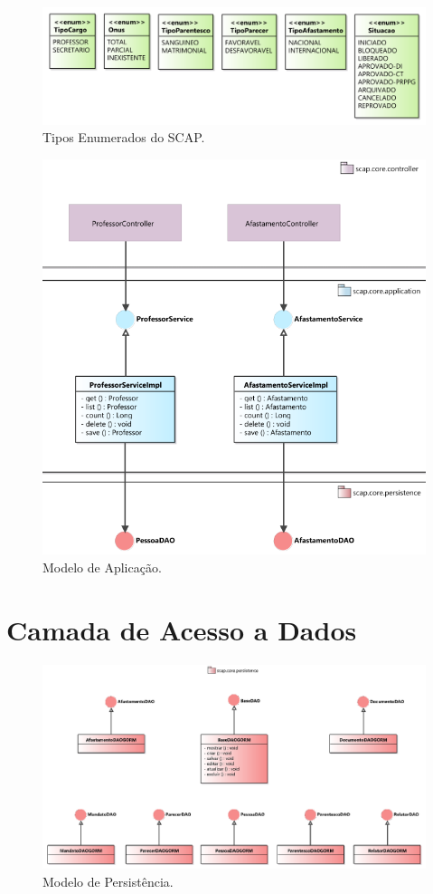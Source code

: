 \begin{figure}[h]
	\centering
	\includegraphics[width=1\textwidth]{figuras/figura-arquitetura-enum.png}
	\caption{Tipos Enumerados do SCAP.}
	\label{figura-arquitetura-enum}
\end{figure}

\begin{figure}[h]
	\centering
	\includegraphics[width=1\textwidth]{figuras/figura-arquitetura-aplicacao.png}
	\caption{Modelo de Aplicação.}
	\label{figura-arquitetura-aplicacao}
\end{figure}

\section{Camada de Acesso a Dados}
\label{sec-arquitetura-dados}


\begin{figure}[h]
	\centering
	\includegraphics[width=1\textwidth]{figuras/figura-arquitetura-persistencia.png}
	\caption{Modelo de Persistência.}
	\label{figura-arquitetura-persistencia}
\end{figure}

